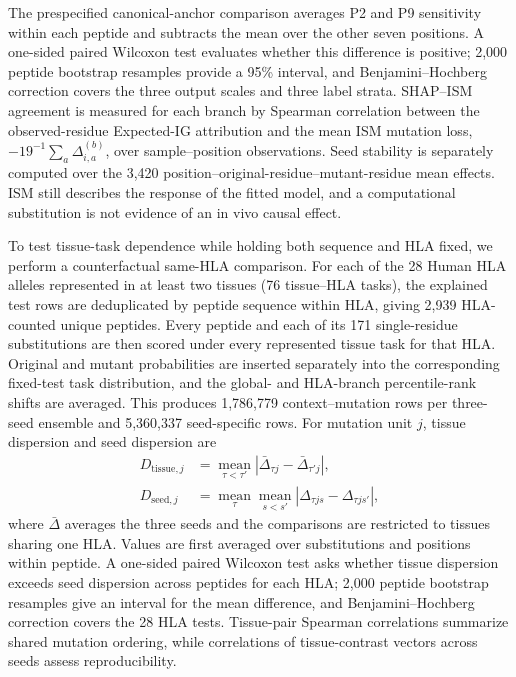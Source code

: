 The prespecified canonical-anchor comparison averages P2 and P9 sensitivity within each peptide and subtracts the mean over the other seven positions. A one-sided paired Wilcoxon test evaluates whether this difference is positive; 2,000 peptide bootstrap resamples provide a 95\% interval, and Benjamini--Hochberg correction covers the three output scales and three label strata. SHAP--ISM agreement is measured for each branch by Spearman correlation between the observed-residue Expected-IG attribution and the mean ISM mutation loss, \(-19^{-1}\sum_a\Delta^{(b)}_{i,a}\), over sample--position observations. Seed stability is separately computed over the 3,420 position--original-residue--mutant-residue mean effects. ISM still describes the response of the fitted model, and a computational substitution is not evidence of an in vivo causal effect.

To test tissue-task dependence while holding both sequence and HLA fixed, we perform a counterfactual same-HLA comparison. For each of the 28 Human HLA alleles represented in at least two tissues (76 tissue--HLA tasks), the explained test rows are deduplicated by peptide sequence within HLA, giving 2,939 HLA-counted unique peptides. Every peptide and each of its 171 single-residue substitutions are then scored under every represented tissue task for that HLA. Original and mutant probabilities are inserted separately into the corresponding fixed-test task distribution, and the global- and HLA-branch percentile-rank shifts are averaged. This produces 1,786,779 context--mutation rows per three-seed ensemble and 5,360,337 seed-specific rows. For mutation unit \(j\), tissue dispersion and seed dispersion are
\[
\begin{aligned}
D_{\mathrm{tissue},j}
&=\operatorname*{mean}_{\tau<\tau'}
\left|\bar{\Delta}_{\tau j}-\bar{\Delta}_{\tau' j}\right|,\\
D_{\mathrm{seed},j}
&=\operatorname*{mean}_{\tau}\operatorname*{mean}_{s<s'}
\left|\Delta_{\tau js}-\Delta_{\tau js'}\right|,
\end{aligned}
\]
where \(\bar{\Delta}\) averages the three seeds and the comparisons are restricted to tissues sharing one HLA. Values are first averaged over substitutions and positions within peptide. A one-sided paired Wilcoxon test asks whether tissue dispersion exceeds seed dispersion across peptides for each HLA; 2,000 peptide bootstrap resamples give an interval for the mean difference, and Benjamini--Hochberg correction covers the 28 HLA tests. Tissue-pair Spearman correlations summarize shared mutation ordering, while correlations of tissue-contrast vectors across seeds assess reproducibility.

